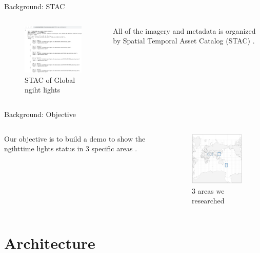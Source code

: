\documentclass[aspectratio=169]{beamer}
\begin{document}
\begin{frame}[fragile]{Background: STAC}

  \begin{columns}
    
    \begin{figure}[htbp]
      \centerline{\includegraphics[width=160pt]{images/STAC.png}}
      \caption{STAC of Global ngiht lights}
      \label{STAC}
    \end{figure}

    All of the imagery and metadata is organized by Spatial Temporal Asset Catalog (STAC) \citep{SpatioTe90:online}. 
  \end{columns}
\end{frame}

\begin{frame}[fragile]{Background: Objective}

  \begin{columns}
    Our objective is to build a demo to show the ngihttime lights status in 3 specific areas \cite{GlobalAd98:online}.
      \begin{figure}[htbp]
        \centerline{\includegraphics[width=130pt]{images/Worldmap.png}}
        \caption{3 areas we researched}
        \label{areas}
      \end{figure}
  \end{columns}
\end{frame}

\section{Architecture}
\end{document}
